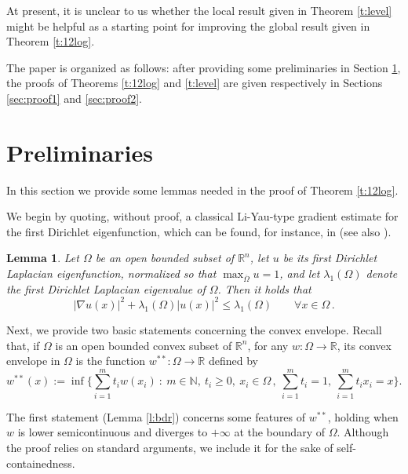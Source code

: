 \documentclass[11pt]{amsart}
\newtheorem{lemma}[theorem]{Lemma}
\theoremstyle{definition}
\theoremstyle{remark}
\def\R{\mathbb{R}}
\def\N{\mathbb{N}}
\def\Om{\Omega}
\begin{document}
\smallskip 
At present, it is unclear to us whether the local result given in Theorem \ref{t:level} 
might be helpful as a starting point for improving the global result given in Theorem \ref{t:12log}.  


\smallskip
The paper is organized as follows: 
after providing some preliminaries in Section \ref{sec:prel}, the proofs of Theorems \ref{t:12log} and \ref{t:level} are given respectively in Sections
\ref{sec:proof1} and \ref{sec:proof2}.  


\section{Preliminaries}\label{sec:prel} 

In this section we provide  some lemmas needed in the proof of Theorem \ref{t:12log}. 

We begin by quoting, without proof, a classical Li-Yau-type gradient estimate for the first Dirichlet eigenfunction, 
which can be found, for instance,
in \cite[Corollary 5.1]{sperb} (see also  \cite{LiYau, yang99}). 
 

\begin{lemma} \label{l:yau}
 Let $\Om$ be an open bounded subset of $\R ^n$, let $u$ be its first Dirichlet Laplacian eigenfunction, normalized so that $\max _{\overline \Om } u =  1$,  and let 
$\lambda _ 1 (\Om)$ denote  the first Dirichlet Laplacian eigenvalue of $\Om$.   Then it holds that
 $$|\nabla u (x)| ^ 2 + \lambda _ 1 (\Om)  | u (x)| ^ 2 \leq \lambda _ 1  (\Om) \qquad \forall x \in \Om \,.$$ 
\end{lemma} 

Next, we provide 
two basic statements concerning
 the convex envelope. 
Recall that, if $\Om$ is an open bounded convex subset  of $\R^n$,
 for any  $w : \Om \to \R$,  its convex envelope   in $\Om$ is the function 
$w ^ { **}:\Om \to \R $ defined by 
 \begin{equation}\label{f:w**} 
w^{**} ( x):= 
\inf \Big \{ \sum_{ i = 1}^{m} t _i w(x_i) \ :\ 
m \in \N,\
t _ i\geq 0,\ x_i \in \Omega\,, \
\sum _{i = 1} ^ m t _ i = 1,\ 
\sum _{i = 1} ^ m t _ i x_i = x  \Big \}.
\end{equation}

The first statement  (Lemma \ref{l:bdr}) concerns some features of  $w^{**}$,  holding when $w$ is  lower semicontinuous and diverges to $+ \infty$ at the boundary of $\Om$.  
Although the proof relies on standard arguments, we include it for the sake of self-containedness.
\end{document}
